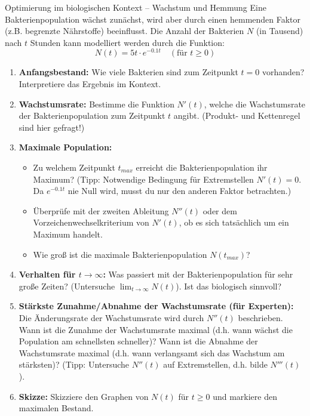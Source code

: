 \begin{aufgabenumgebung}{Optimierung im biologischen Kontext – Wachstum und Hemmung}
Eine Bakterienpopulation wächst zunächst, wird aber durch einen hemmenden Faktor (z.B. begrenzte Nährstoffe) beeinflusst. Die Anzahl der Bakterien $N$ (in Tausend) nach $t$ Stunden kann modelliert werden durch die Funktion:
\[ N(t) = 5t \cdot e^{-0.1t} \quad (\text{für } t \ge 0) \]
\begin{enumerate}
    \item \textbf{Anfangsbestand:} Wie viele Bakterien sind zum Zeitpunkt $t=0$ vorhanden? Interpretiere das Ergebnis im Kontext.
    \item \textbf{Wachstumsrate:} Bestimme die Funktion $N'(t)$, welche die Wachstumsrate der Bakterienpopulation zum Zeitpunkt $t$ angibt. (Produkt- und Kettenregel sind hier gefragt!)
    \item \textbf{Maximale Population:}
        \begin{itemize}
            \item Zu welchem Zeitpunkt $t_{max}$ erreicht die Bakterienpopulation ihr Maximum? (Tipp: Notwendige Bedingung für Extremstellen $N'(t)=0$. Da $e^{-0.1t}$ nie Null wird, musst du nur den anderen Faktor betrachten.)
            \item Überprüfe mit der zweiten Ableitung $N''(t)$ oder dem Vorzeichenwechselkriterium von $N'(t)$, ob es sich tatsächlich um ein Maximum handelt.
            \item Wie groß ist die maximale Bakterienpopulation $N(t_{max})$?
        \end{itemize}
    \item \textbf{Verhalten für $t \to \infty$:} Was passiert mit der Bakterienpopulation für sehr große Zeiten? (Untersuche $\lim_{t \to \infty} N(t)$). Ist das biologisch sinnvoll?
    \item \textbf{Stärkste Zunahme/Abnahme der Wachstumsrate (für Experten):}
        Die Änderungsrate der Wachstumsrate wird durch $N''(t)$ beschrieben. Wann ist die Zunahme der Wachstumsrate maximal (d.h. wann wächst die Population am schnellsten schneller)? Wann ist die Abnahme der Wachstumsrate maximal (d.h. wann verlangsamt sich das Wachstum am stärksten)? (Tipp: Untersuche $N''(t)$ auf Extremstellen, d.h. bilde $N'''(t)$).
    \item \textbf{Skizze:} Skizziere den Graphen von $N(t)$ für $t \ge 0$ und markiere den maximalen Bestand.
\end{enumerate}
\end{aufgabenumgebung}


